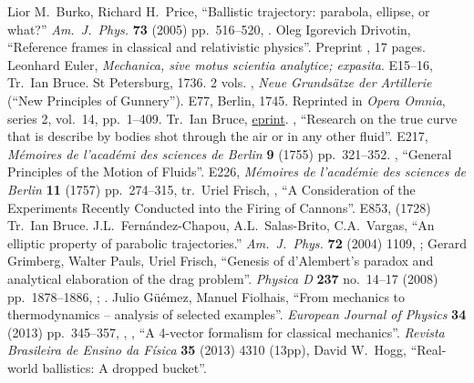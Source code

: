 \begin{thebibliography}{99}\footnotesize%
\setlength{\itemsep}{0pt plus 0.3ex}%
\setlength{\parskip}{0pt}
  Lior M.~Burko, Richard H.~Price,
  ``Ballistic trajectory: parabola, ellipse, or what?''
  \emph{Am.\ J.\ Phys.} {\bf 73} (2005) pp.~516--520,
  . 
  Oleg Igorevich Drivotin,
  ``Reference frames in classical and relativistic physics''.
  Preprint , 17 pages.
  Leonhard Euler, 
  \emph{Mechanica, sive motus scientia analytice; expasita}.
  E15--16,
  Tr.\ Ian Bruce. St Petersburg, 1736. 2 vols.
  \bysame, 
  \emph{Neue Grunds\"atze der Artillerie} (``New Principles of Gunnery'').
  E77,
  Berlin, 1745. Reprinted in \emph{Opera Omnia}, series 2, vol.~14,
  pp.~1--409. Tr.\ Ian Bruce, \href{http://www.17centurymaths.com/contents/eulerartillery.htm}{eprint}.
  \bysame, 
  ``Research on the true curve that is describe by bodies shot through
  the air or in any other fluid''.
  E217,
  \emph{M\'emoires de l'acad\'emi des sciences de Berlin}
  \textbf{9} (1755) pp.~321--352.
  \bysame, 
  ``General Principles of the Motion of Fluids''.
  E226,
  \emph{M\'emoires de l'acad\'emie des sciences de Berlin}
  {\bf 11} (1757) pp.~274--315, tr.~Uriel Frisch,
  \bysame,
  ``A Consideration of the Experiments Recently Conducted into the
  Firing of Cannons''.
  E853,
  (1728)
  Tr.\ Ian Bruce.
  J.L.~Fern\'andez-Chapou, A.L.~Salas-Brito, C.A.~Vargas,
  ``An elliptic property of parabolic trajectories.''
  \emph{Am.\ J.\ Phys.} \textbf{72} (2004) 1109,
  ;
  Gerard Grimberg, Walter Pauls, Uriel Frisch,
  ``Genesis of d'Alembert's paradox and analytical elaboration of the drag problem''.
  \emph{Physica D} {\bf237} no.~14--17 (2008) pp.~1878--1886,
  ;
  .
  Julio G\"u\'emez, Manuel Fiolhais,
  ``From mechanics to thermodynamics -- analysis of selected examples''.
  \emph{European Journal of Physics} {\bf 34} (2013) pp.~345--357,
  \bysame, \bysame,
  ``A 4-vector formalism for classical mechanics''.
  \emph{Revista Brasileira de Ensino da F\'isica} \textbf{35} 
  (2013) 4310 (13pp), 
  David W.~Hogg, ``Real-world ballistics: A dropped bucket''.

\end{thebibliography}
